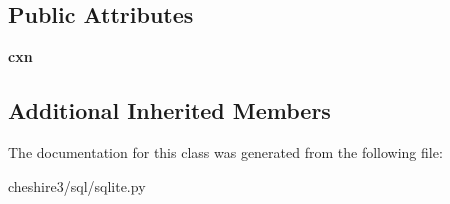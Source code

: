 \subsection*{Public Attributes}
\begin{DoxyCompactItemize}
\item 
\hypertarget{classcheshire3_1_1sql_1_1sqlite_1_1_trivial_sqlite_result_set_store_a09601d736972961edfbc0c55aa9326c3}{{\bfseries cxn}}\label{classcheshire3_1_1sql_1_1sqlite_1_1_trivial_sqlite_result_set_store_a09601d736972961edfbc0c55aa9326c3}

\end{DoxyCompactItemize}
\subsection*{Additional Inherited Members}


The documentation for this class was generated from the following file\-:\begin{DoxyCompactItemize}
\item 
cheshire3/sql/sqlite.\-py\end{DoxyCompactItemize}
